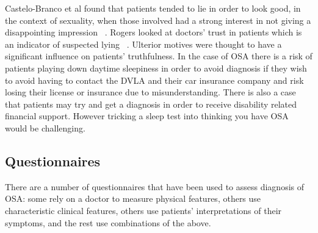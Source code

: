 Castelo-Branco et al found that patients tended to lie in order to look good, in the context of sexuality, when those involved had a strong interest in not giving a disappointing impression ~\cite{castelo2010patients}. Rogers looked at doctors’ trust in patients which is an indicator of suspected lying ~\cite{rogers2002there}. Ulterior motives were thought to have a significant influence on patients’ truthfulness. In the case of OSA there is a risk of patients playing down daytime sleepiness in order to avoid diagnosis if they wish to avoid having to contact the DVLA and their car insurance company and risk losing their license or insurance due to misunderstanding. There is also a case that patients may try and get a diagnosis in order to receive disability related financial support. However tricking a sleep test into thinking you have OSA would be challenging. 

\subsection{Questionnaires}
There are a number of questionnaires that have been used to assess diagnosis of OSA: some rely on a doctor to measure physical features, others use characteristic clinical features, others use patients’ interpretations of their symptoms, and the rest use combinations of the above. 

